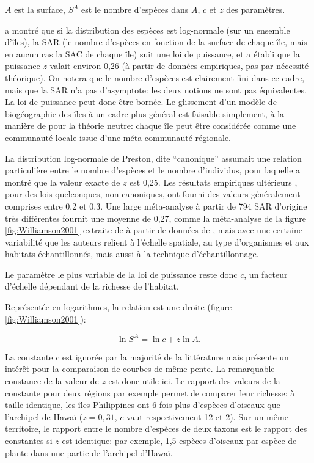 \documentclass[
  11pt,
  french,
  a4paper,
  extrafontsizes,onecolumn,openright
  ]{memoir}
\newlength{\rf}
\begin{document}
\(A\) est la surface, \(S^{A}\) est le nombre d'espèces dans \(A\), \(c\) et \(z\) des paramètres.

\textcite{Preston1962} a montré que si la distribution des espèces est log-normale (sur un ensemble d'îles), la SAR (le nombre d'espèces en fonction de la surface de chaque île, mais en aucun cas la SAC de chaque île) suit une loi de puissance, et a établi que la puissance \(z\) valait environ 0,26 (à partir de données empiriques, pas par nécessité théorique).
On notera que le nombre d'espèces est clairement fini dans ce cadre, mais que la SAR n'a pas d'asymptote: les deux notions ne sont pas équivalentes.
La loi de puissance peut donc être bornée.
Le glissement d'un modèle de biogéographie des îles à un cadre plus général est faisable simplement, à la manière de \textcite{Hubbell2001} pour la théorie neutre: chaque île peut être considérée comme une communauté locale issue d'une méta-communauté régionale.

La distribution log-normale de Preston, dite ``canonique'' assumait une relation particulière entre le nombre d'espèces et le nombre d'individus, pour laquelle \textcite{May1975} a montré que la valeur exacte de \(z\) est 0,25.
Les résultats empiriques ultérieurs \autocite{May1975,May2000}, pour des lois quelconques, non canoniques, ont fourni des valeurs généralement comprises entre 0,2 et 0,3.
Une large méta-analyse \autocite{Drakare2006} à partir de 794 SAR d'origine très différentes fournit une moyenne de 0,27, comme la méta-analyse de la figure \ref{fig:Williamson2001} extraite de \textcite{Williamson2001} à partir de données de \textcite{Lonsdale1999}, mais avec une certaine variabilité que les auteurs relient à l'échelle spatiale, au type d'organismes et aux habitats échantillonnés, mais aussi à la technique d'échantillonnage.

Le paramètre le plus variable de la loi de puissance reste donc \(c\), un facteur d'échelle dépendant de la richesse de l'habitat.

Représentée en logarithmes, la relation est une droite (figure \ref{fig:Williamson2001}):

\begin{equation}
  \label{eq:Arrhenius1921log}
  \ln S^{A} = \ln c + z\ln A.
\end{equation}

La constante \(c\) est ignorée par la majorité de la littérature \autocite{Gould1979} mais présente un intérêt pour la comparaison de courbes de même pente.
La remarquable constance de la valeur de \(z\) est donc utile ici.
Le rapport des valeurs de la constante pour deux régions par exemple permet de comparer leur richesse: à taille identique, les îles Philippines ont 6 fois plus d'espèces d'oiseaux que l'archipel de Hawaï (\(z=0,31\), \(c\) vaut respectivement 12 et 2).
Sur un même territoire, le rapport entre le nombre d'espèces de deux taxons est le rapport des constantes si \(z\) est identique: par exemple, 1,5 espèces d'oiseaux par espèce de plante dans une partie de l'archipel d'Hawaï.
\end{document}

